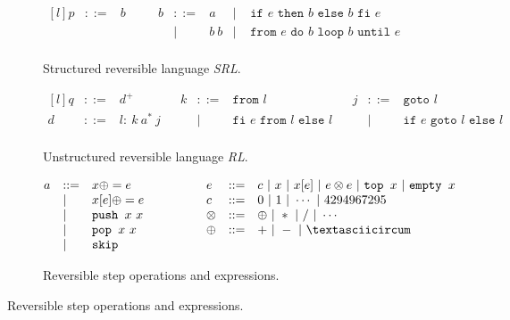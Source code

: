 \begin{figure}[]

  \begin{subfigure}{\textwidth}
    \center
    $$\begin{matrix*}[l]
      {p} & ::= & {b} & \quad & {b} & ::= & a             & | & \texttt{ if }e\texttt{ then }b\texttt{ else }b\texttt{ fi }e\\
                 &     &           &        &            &  |  & b\ b & | & \texttt{ from }e\texttt{ do }b\texttt{ loop }b\texttt{ until }e\\
    \end{matrix*}$$
    \caption{Structured reversible language \textit{SRL}.}
    \label{fig:srlspec}
  \end{subfigure}

  \begin{subfigure}{\textwidth}
    \center
    $$\begin{matrix*}[l]
      {q} & ::= & {d}^+                                      & & {k} & ::= & \texttt{from }l & & {j} & ::= & \texttt{goto }l\\
      {d} & ::= & {l}:\ {k}\ {a}^*\ {j} &       &            &  |  & \texttt{fi }e\texttt{ from }l\texttt{ else }l &
        & & | & \texttt{if }e\texttt{ goto }l\texttt{ else }l\\
    \end{matrix*}$$
    \caption{Unstructured reversible language \textit{RL}.}
    \label{fig:rlspec}
  \end{subfigure}

  \begin{subfigure}{\textwidth}
    \center
    $$\begin{matrix*}[l]
      {a} & ::= & {x}\oplus= e & \quad\quad\quad &  e & ::= & {c} \ | \ {x} \ | \ {x}[ e] \ | \  e\otimes e \ | \ \texttt{top }{x} \ | \ \texttt{empty }{x}\\
                 &  |  & {x}[ e]\oplus= e &     & {c} & ::= & 0\ | \ 1\ |\ \cdots\ |\ 4294967295\\
                 &  |  & \texttt{push }{x}\ {x}      &     & \otimes    & ::= & \oplus \ | \ * \ | \ / \ | \ \cdots\\
                 &  |  & \texttt{pop  }{x}\ {x}      &     & \oplus     & ::= & +  \ | \  -  \ | \  \textasciicircum\\
                 &  |  & \texttt{skip}\\
    \end{matrix*}$$
    \caption{Reversible step operations and expressions.}
  \end{subfigure}


\end{figure}
